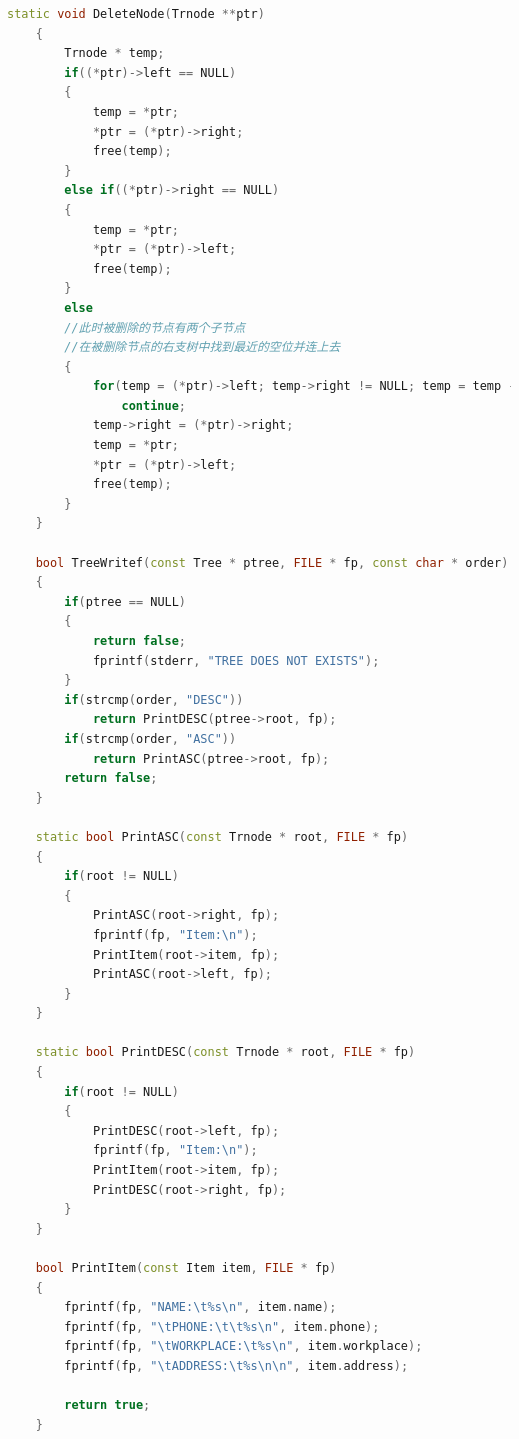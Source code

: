 \documentclass[12pt, a4paper, oneside]{ctexart}
\begin{document}
\begin{framed}
\begin{lstlisting}[language=C++]
    static void DeleteNode(Trnode **ptr)
    {
        Trnode * temp;
        if((*ptr)->left == NULL)
        {
            temp = *ptr;
            *ptr = (*ptr)->right;
            free(temp);
        }
        else if((*ptr)->right == NULL)
        {
            temp = *ptr;
            *ptr = (*ptr)->left;
            free(temp);
        }
        else
        //此时被删除的节点有两个子节点
        //在被删除节点的右支树中找到最近的空位并连上去
        {
            for(temp = (*ptr)->left; temp->right != NULL; temp = temp ->right)
                continue;
            temp->right = (*ptr)->right;
            temp = *ptr;
            *ptr = (*ptr)->left;
            free(temp);
        }
    }
    
    bool TreeWritef(const Tree * ptree, FILE * fp, const char * order)
    {
        if(ptree == NULL)
        {
            return false;
            fprintf(stderr, "TREE DOES NOT EXISTS");
        }
        if(strcmp(order, "DESC"))
            return PrintDESC(ptree->root, fp);
        if(strcmp(order, "ASC"))
            return PrintASC(ptree->root, fp);
        return false;
    }
    
    static bool PrintASC(const Trnode * root, FILE * fp)
    {   
        if(root != NULL)
        {
            PrintASC(root->right, fp);
            fprintf(fp, "Item:\n");
            PrintItem(root->item, fp);
            PrintASC(root->left, fp);
        }
    }
    
    static bool PrintDESC(const Trnode * root, FILE * fp)
    {   
        if(root != NULL)
        {
            PrintDESC(root->left, fp);
            fprintf(fp, "Item:\n");
            PrintItem(root->item, fp);
            PrintDESC(root->right, fp);
        }
    }
    
    bool PrintItem(const Item item, FILE * fp)
    {
        fprintf(fp, "NAME:\t%s\n", item.name);
        fprintf(fp, "\tPHONE:\t\t%s\n", item.phone);
        fprintf(fp, "\tWORKPLACE:\t%s\n", item.workplace);
        fprintf(fp, "\tADDRESS:\t%s\n\n", item.address);
    
        return true;
    }
    

\end{lstlisting}
\end{framed}
\end{document}
